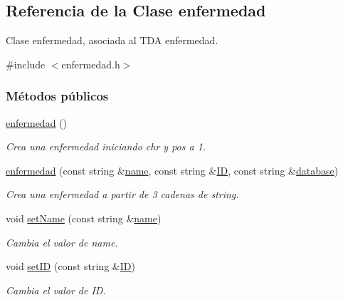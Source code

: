 \hypertarget{classenfermedad}{\subsection{Referencia de la Clase enfermedad}
\label{classenfermedad}
}


Clase enfermedad, asociada al T\-D\-A enfermedad.  




{\ttfamily \#include $<$enfermedad.\-h$>$}

\subsubsection*{Métodos públicos}
\begin{DoxyCompactItemize}
\item 
\hyperlink{classenfermedad_a60eb5e620b0bf9a53d4f0980031aeefd}{enfermedad} ()
\begin{DoxyCompactList}\small\item\em Crea una enfermedad iniciando chr y pos a 1. \end{DoxyCompactList}\item 
\hyperlink{classenfermedad_a7caef55b00a31ce18191ceaba81ed20c}{enfermedad} (const string \&\hyperlink{classenfermedad_ad7c4204057028a73bde6022678c6813e}{name}, const string \&\hyperlink{classenfermedad_a689cdbd469ecc28e045bda2f62a229d2}{I\-D}, const string \&\hyperlink{classenfermedad_a3684b7ec850d4c9357dd21bdd5e02803}{database})
\begin{DoxyCompactList}\small\item\em Crea una enfermedad a partir de 3 cadenas de string. \end{DoxyCompactList}\item 
void \hyperlink{classenfermedad_a18f621d13de01c0b06a05757ddd8a087}{set\-Name} (const string \&\hyperlink{classenfermedad_ad7c4204057028a73bde6022678c6813e}{name})
\begin{DoxyCompactList}\small\item\em Cambia el valor de name. \end{DoxyCompactList}\item 
void \hyperlink{classenfermedad_a5ad52bdce8de9ac4fe25b460dc699af4}{set\-I\-D} (const string \&\hyperlink{classenfermedad_a689cdbd469ecc28e045bda2f62a229d2}{I\-D})
\begin{DoxyCompactList}\small\item\em Cambia el valor de I\-D. \end{DoxyCompactList}\item 

\end{DoxyCompactItemize}
